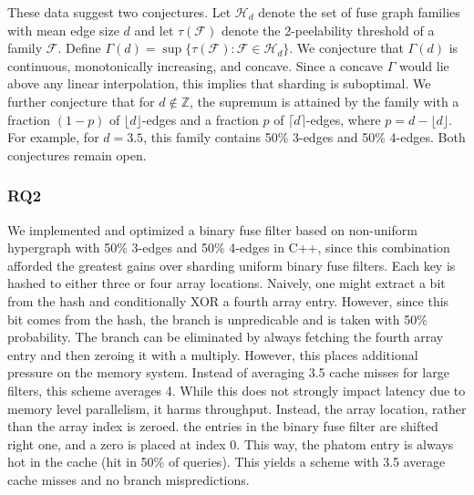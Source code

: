 \noindent
These data suggest two conjectures. Let $\mathcal{H}_d$ denote the set of fuse graph families with mean edge size $d$ and let $\tau(\mathcal{F})$ 
denote the 2-peelability threshold of a family $\mathcal{F}$. Define $\Gamma(d) = \sup \{ \tau(\mathcal{F}) : \mathcal{F} \in \mathcal{H}_d \}$. We conjecture 
that $\Gamma(d)$ is continuous, monotonically increasing, and concave. Since a concave $\Gamma$ would lie above any linear interpolation, this implies that 
sharding is suboptimal. We further conjecture that for $d \not \in \mathbb{Z}$, the supremum is attained by the family with a fraction $(1 - p)$ of 
$\lfloor d \rfloor$-edges and a fraction $p$ of $\lceil d \rceil$-edges, where $p = d - \lfloor d \rfloor$. For example, for $d = 3.5$, this family contains
50\% 3-edges and 50\% 4-edges. Both conjectures remain open.

\subsubsection{RQ2}

\noindent
We implemented and optimized a binary fuse filter based on non-uniform hypergraph with 50\% 3-edges and 50\% 4-edges in C++, since this combination afforded the
greatest gains over sharding uniform binary fuse filters. Each key is hashed to either three or four array locations. Naively,
one might extract a bit from the hash and conditionally XOR a fourth array entry. However, since this bit comes from the hash, the branch is unpredicable and
is taken with 50\% probability. The branch can be eliminated by always fetching the fourth array entry and then zeroing it with a multiply. However, this places
additional pressure on the memory system. Instead of averaging 3.5 cache misses for large filters, this scheme averages 4. While this does not strongly impact 
latency due to memory level parallelism, it harms throughput. Instead, the array location, rather than the array index is zeroed. the entries in the binary 
fuse filter are shifted right one, and a zero is placed at index 0. This way, the phatom entry is always hot in the cache (hit in 50\% of queries). This yields
a scheme with 3.5 average cache misses and no branch mispredictions. 


